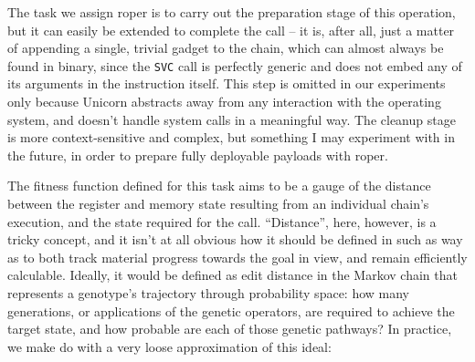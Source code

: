 \documentclass[12pt,glossary]{dalthesis}
\begin{document}
The task we assign \gls{roper} is to carry out the preparation stage of this operation,
but it can easily be extended to complete the call -- it is, after all, just a matter
of appending a single, trivial gadget to the chain, which can almost always be found
in binary, since the \texttt{SVC} call is perfectly generic and does not embed any of its
arguments in the instruction itself. This step is omitted in our experiments only
because Unicorn abstracts away from any interaction with the operating system, and
doesn't handle system calls in a meaningful way. The cleanup stage is more context-sensitive
and complex, but something I may experiment with in the future, in order to prepare
fully deployable payloads with \gls{roper}.

The fitness function defined for this task aims to be a gauge of the distance between
the register and memory state resulting from an individual chain's execution, and
the state required for the call. ``Distance'', here, however, is a tricky concept, and
it isn't at all obvious how it should be defined in such as way as to both track
material progress towards the goal in view, and remain efficiently calculable. Ideally,
it would be defined as edit distance in the Markov chain that represents a genotype's
trajectory through probability space: how many generations, or applications of the
genetic operators, are required to achieve the target state, and how probable are each
of those genetic pathways? In practice, we make do with a very loose approximation of
this ideal:
\end{document}
